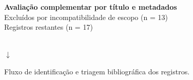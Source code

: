 \begin{figure}[H]
{\begin{minipage}{0.88\textwidth}
\centering
\textbf{Avaliação complementar por título e metadados}\\
Excluídos por incompatibilidade de escopo (n = 13)\\
Registros restantes (n = 17)
\end{minipage}}\\[4pt]
$\downarrow$\\[4pt]
\begin{minipage}[t]{0.53\textwidth}
\centering
{}
\end{minipage}\hfill
\begin{minipage}[t]{0.43\textwidth}
\centering
{}
\end{minipage}
\caption{Fluxo de identificação e triagem bibliográfica dos registros.}
\label{fig:fluxo-selecao-prisma}
\end{figure}
